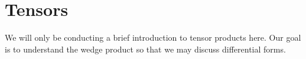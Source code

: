 \newpage\setcounter{section}{11}
\section{Tensors}

We will only be conducting a brief introduction to tensor products here. Our goal is to understand the wedge product so that we may discuss differential forms.

